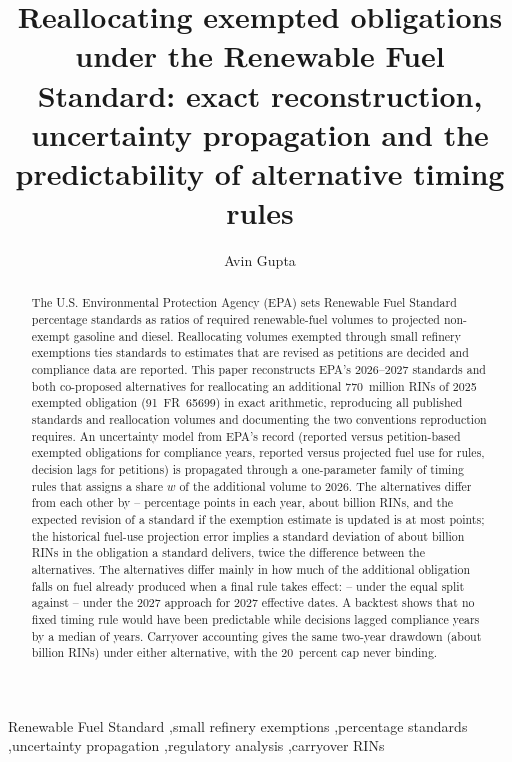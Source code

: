 \documentclass[preprint,12pt,authoryear]{elsarticle}
\newcommand{\releaseversion}{1.0.3}
\newcommand{\manuscriptdate}{November 24, 2026}
\begin{document}
\begin{frontmatter}
\title{Reallocating exempted obligations under the Renewable Fuel Standard: exact reconstruction, uncertainty propagation and the predictability of alternative timing rules}
\author{Avin Gupta}
\address{Independent researcher\\[0.4em] Version \releaseversion, \manuscriptdate}

\begin{abstract}
The U.S. Environmental Protection Agency (EPA) sets Renewable Fuel Standard percentage standards as ratios of required renewable-fuel volumes to projected non-exempt gasoline and diesel. Reallocating volumes exempted through small refinery exemptions ties standards to estimates that are revised as petitions are decided and compliance data are reported. This paper reconstructs EPA's 2026--2027 standards and both co-proposed alternatives for reallocating an additional 770~million RINs of 2025 exempted obligation (91~FR~65699) in exact arithmetic, reproducing all \valnStandardsChecked{} published standards and reallocation volumes and documenting the two conventions reproduction requires. An uncertainty model from EPA's record (reported versus petition-based exempted obligations for \valnRevisionPairs{} compliance years, reported versus projected fuel use for \valnFuelErrorsProspective{} rules, decision lags for \valnLagPetitions{} petitions) is propagated through a one-parameter family of timing rules that assigns a share $w$ of the additional volume to 2026. The alternatives differ from each other by \valstepFirstEqual{}--\valstepSecondEqual{} percentage points in each year, about \valstepEqualBRinsSecond{} billion RINs, and the expected revision of a standard if the exemption estimate is updated is at most \valrevisionMeanAbsSecondAllSecond{} points; the historical fuel-use projection error implies a standard deviation of about \valrealizedMinusIntendedSdSecondEqual{} billion RINs in the obligation a standard delivers, twice the difference between the alternatives. The alternatives differ mainly in how much of the additional obligation falls on fuel already produced when a final rule takes effect: \valretroEqualScenarioHypotheticalEarlyTwoZeroTwoSeven{}--\valretroEqualScenarioHypotheticalLateTwoZeroTwoSeven{} under the equal split against \valretroAllSecondScenarioHypotheticalEarlyTwoZeroTwoSeven{}--\valretroAllSecondScenarioHypotheticalLateTwoZeroTwoSeven{} under the 2027 approach for 2027 effective dates. A backtest shows that no fixed timing rule would have been predictable while decisions lagged compliance years by a median of \vallagMedianYears{} years. Carryover accounting gives the same two-year drawdown (about \valdrawdownTwoYearsEqual{} billion RINs) under either alternative, with the 20~percent cap never binding.
\end{abstract}

\begin{keyword}
Renewable Fuel Standard \sep small refinery exemptions \sep percentage standards \sep uncertainty propagation \sep regulatory analysis \sep carryover RINs
\end{keyword}
\end{frontmatter}
\end{document}
